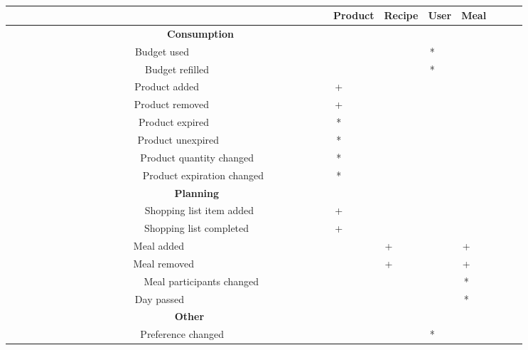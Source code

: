 \begin{table}
    \begin{tabular}{|r|c|c|c|c|c|c|}
        \hline
        ~                                      & Product & Recipe & User & Meal & ~ & ~ \\ \hline
        \textbf{Consumption}                   & ~       & ~      & ~    & ~    & ~ & ~ \\ 
        Budget used                            & ~       & ~      & *    & ~    & ~ & ~ \\ 
        Budget refilled                        & ~       & ~      & *    & ~    & ~ & ~ \\ 
        Product added                          & +       & ~      & ~    & ~    & ~ & ~ \\ 
        Product removed                        & +       & ~      & ~    & ~    & ~ & ~ \\ 
        Product expired                        & *       & ~      & ~    & ~    & ~ & ~ \\ 
        Product unexpired                      & *       & ~      & ~    & ~    & ~ & ~ \\ 
        Product quantity changed               & *       & ~      & ~    & ~    & ~ & ~ \\ 
        Product expiration changed             & *       & ~      & ~    & ~    & ~ & ~ \\ 
        \textbf{Planning}                      & ~       & ~      & ~    & ~    & ~ & ~ \\ 
        Shopping list item added               & +       & ~      & ~    & ~    & ~ & ~ \\ 
        Shopping list completed                & +       & ~      & ~    & ~    & ~ & ~ \\ 
        Meal added                             & ~       & +      & ~    & +    & ~ & ~ \\ 
        Meal removed                           & ~       & +      & ~    & +    & ~ & ~ \\ 
        Meal participants changed              & ~       & ~      & ~    & *    & ~ & ~ \\ 
        Day passed                             & ~       & ~      & ~    & *    & ~ & ~ \\ 
        \textbf{Other}                         & ~       & ~      & ~    & ~    & ~ & ~ \\ 
        Preference changed                     & ~       & ~      & *    & ~    & ~ & ~ \\ 

\end{tabular}
\end{table}

